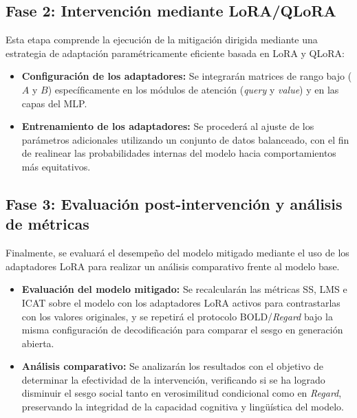 \documentclass[12pt,a4paper]{report}
\begin{document}
\subsection{Fase 2: Intervención mediante LoRA/QLoRA}
\label{subsec:fase_intervencion}

Esta etapa comprende la ejecución de la mitigación dirigida mediante una estrategia de adaptación paramétricamente eficiente basada en LoRA y QLoRA:

\begin{itemize}
    \item \textbf{Configuración de los adaptadores:} Se integrarán matrices de rango bajo ($A$ y $B$) específicamente en los módulos de atención (\textit{query} y \textit{value}) y en las capas del MLP.
    \item \textbf{Entrenamiento de los adaptadores:} Se procederá al ajuste de los parámetros adicionales utilizando un conjunto de datos balanceado, con el fin de realinear las probabilidades internas del modelo hacia comportamientos más equitativos.
\end{itemize}

\subsection{Fase 3: Evaluación post-intervención y análisis de métricas}
\label{subsec:evaluacion_comparativa}

Finalmente, se evaluará el desempeño del modelo mitigado mediante el uso de los adaptadores LoRA para realizar un análisis comparativo frente al modelo base.

\begin{itemize}
    \item \textbf{Evaluación del modelo mitigado:} Se recalcularán las métricas SS, LMS e ICAT sobre el modelo con los adaptadores LoRA activos para contrastarlas con los valores originales, y se repetirá el protocolo BOLD/\textit{Regard} bajo la misma configuración de decodificación para comparar el sesgo en generación abierta.
    \item \textbf{Análisis comparativo:} Se analizarán los resultados con el objetivo de determinar la efectividad de la intervención, verificando si se ha logrado disminuir el sesgo social tanto en verosimilitud condicional como en \textit{Regard}, preservando la integridad de la capacidad cognitiva y lingüística del modelo.
\end{itemize}

\end{document}
